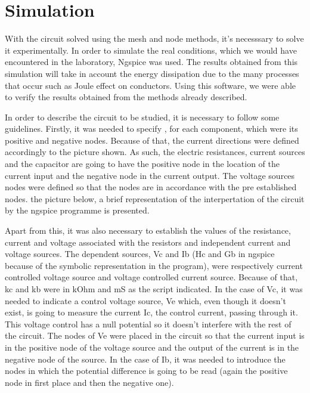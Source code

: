 
\section{Simulation}
\label{sec:simulation}

\par  With the circuit solved using the mesh and node methods, it's necesssary to solve it experimentally. In order to simulate the real conditions, which we would have encountered in the laboratory, Ngspice was used. The results obtained from this simulation will take in account the energy dissipation due to the many processes that occur such as Joule effect on conductors. Using this software, we were able to verify the results obtained from the methods already described. 

\par  In order to describe the circuit to be studied, it is necessary to follow some guidelines. Firstly, it was needed to specify , for each component, which were its positive and negative nodes. Because of that, the current directions were defined accordingly to the picture shown. As such, the electric resistances, current sources and the capacitor are going to have the positive node in the location of the current input and the negative node in the current output. The voltage sources nodes were defined so that the nodes are in accordance with the pre established nodes.  the picture below, a brief representation of the interpertation of the circuit by the ngspice programme is presented.

\par Apart from this, it was also necessary to establish the values of the resistance, current and voltage associated with the resistors and independent current and voltage sources. The dependent sources, Vc and Ib (Hc and Gb in ngspice because of the symbolic representation in the program), were respectively current controlled voltage source and voltage controlled current source. Because of that, kc and kb were in kOhm and mS as the script indicated. In the case of Vc, it was needed to indicate a control voltage source, Ve which, even though it doesn't exist, is going to measure the current Ic, the control current, passing through it. This voltage control has a null potential so it doesn't interfere with the rest of the circuit. The nodes of Ve were placed in the circuit so that the current input is in the positive node of the voltage source and the output of the current is in the negative node of the source.  In the case of Ib, it was needed to introduce the nodes in which the potential difference is going to be read (again the positive node in first place and then the negative one).

